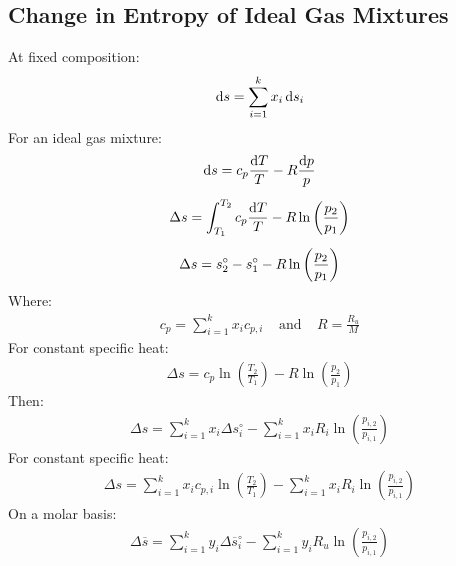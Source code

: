\documentclass[class=report, crop=false, 12pt,a4paper]{standalone}
\begin{document}
\subsection{Change in Entropy of Ideal Gas Mixtures}
At fixed composition:
\begin{gather}
  \dif s = \sum_{i=1}^{k}x_i \dif s_i
\end{gather}
For an ideal gas mixture:
\begin{gather}
  \dif s = c_p\frac{\dif T}{T} - R\frac{\dif p}{p} \\[5pt]
  \Delta s = \int_{T_1}^{T_2}c_p\frac{\dif T}{T} - R\ln\left(\frac{p_2}{p_1}\right) \\[5pt]
  \Delta s = s_2^\circ - s_1^\circ - R\ln\left(\frac{p_2}{p_1}\right)
\end{gather}
Where:
\begin{gather}
  c_p = \sum_{i=1}^{k}x_i c_{p,i} \ \ \ \ \ \text{and} \ \ \ \ \ R = \frac{R_u}{M}
\end{gather}
For constant specific heat:
\begin{gather}
  \Delta s = c_p\ln\left(\frac{T_2}{T_1}\right) - R\ln\left(\frac{p_2}{p_1}\right)
\end{gather}
Then:
\begin{gather}
  \Delta s = \sum_{i=1}^{k}x_i \Delta s_i^\circ - \sum_{i=1}^{k}x_i R_i \ln\left(\frac{p_{i,2}}{p_{i,1}}\right)
\end{gather}
For constant specific heat:
\begin{gather}
  \Delta s = \sum_{i=1}^{k}x_i c_{p,i}\ln\left(\frac{T_2}{T_1}\right) - \sum_{i=1}^{k}x_i R_i \ln\left(\frac{p_{i,2}}{p_{i,1}}\right)
\end{gather}
On a molar basis:
\begin{gather}
  \Delta\overline{s} = \sum_{i=1}^{k}y_i \Delta \overline{s}_i^\circ - \sum_{i=1}^{k}y_i R_u \ln\left(\frac{p_{i,2}}{p_{i,1}}\right)
\end{gather}
\end{document}
